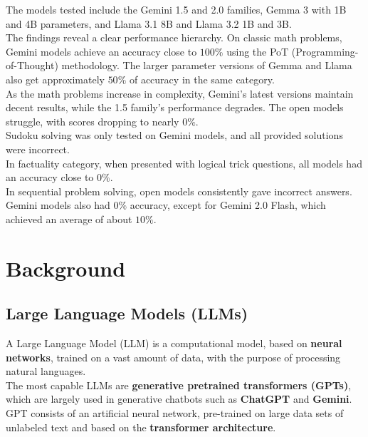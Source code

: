 \documentclass[12pt]{article}
\begin{document}
The models tested include the Gemini 1.5 and 2.0 families, Gemma 3 with 1B and 4B parameters, and Llama 3.1 8B and Llama 3.2 1B and 3B.\\
The findings reveal a clear performance hierarchy. On classic math problems, Gemini models achieve an accuracy close to $100\%$ using the PoT (Programming-of-Thought) methodology. The larger parameter versions of Gemma and Llama also get approximately $50\%$ of accuracy in the same category. \\
As the math problems increase in complexity, Gemini's latest versions maintain decent results, while the 1.5 family's performance degrades. The open models struggle, with scores dropping to nearly $0\%$.\\
Sudoku solving was only tested on Gemini models, and all provided solutions were incorrect.\\
In factuality category, when presented with logical trick questions, all models had an accuracy close to $0\%$.\\
In sequential problem solving, open models consistently gave incorrect answers. Gemini models also had $0\%$ accuracy, except for Gemini 2.0 Flash, which achieved an average of about $10\%$.

\clearpage
\section{Background}
    \subsection{Large Language Models (LLMs)}
A Large Language Model (LLM) is a computational model, based on \textbf{neural networks}, trained on a vast amount of data, with the purpose of processing natural languages.\\
The most capable LLMs are \textbf{generative pretrained transformers (GPTs)}, which are largely used in generative chatbots such as \textbf{ChatGPT} and \textbf{Gemini}. GPT consists of an artificial neural network, pre-trained on large data sets of unlabeled text and based on the \textbf{transformer architecture}.
\end{document}
